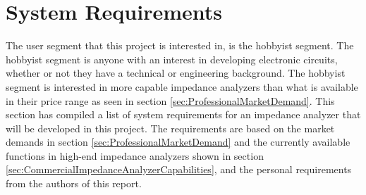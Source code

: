\chapter{System Requirements} \label{ch:SystemRequirements}
The user segment that this project is interested in, is the hobbyist segment. The hobbyist segment is anyone with an interest in developing electronic circuits, whether or not they have a technical or engineering background. The hobbyist segment is interested in more capable impedance analyzers than what is available in their price range as seen in section \ref{sec:ProfessionalMarketDemand}. This section has compiled a list of system requirements for an impedance analyzer that will be developed in this project. The requirements are based on the market demands in section \ref{sec:ProfessionalMarketDemand} and the currently available functions in high-end impedance analyzers shown in section \ref{sec:CommercialImpedanceAnalyzerCapabilities}, and the personal requirements from the authors of this report. 
